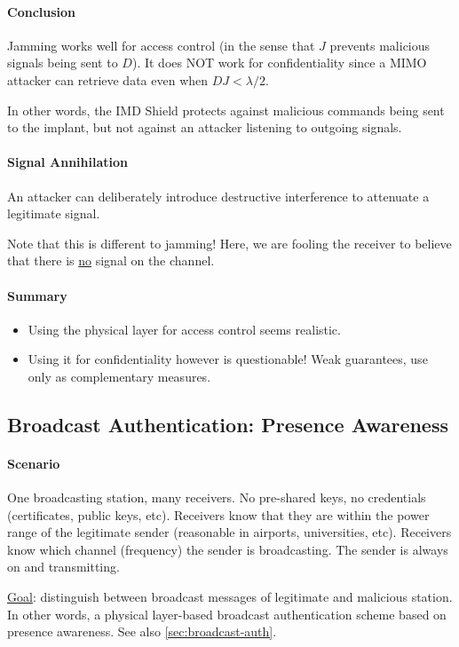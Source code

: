 \paragraph{Conclusion}
Jamming works well for access control (in the sense that $J$ prevents malicious signals being sent to $D$).
It does NOT work for confidentiality since a MIMO attacker can retrieve data even when $DJ < \lambda/2$.

In other words, the IMD Shield protects against malicious commands being sent to the implant, but not against an attacker listening to outgoing signals.

\paragraph{Signal Annihilation}
An attacker can deliberately introduce destructive interference to attenuate a legitimate signal.

Note that this is different to jamming!
Here, we are fooling the receiver to believe that there is \underline{no} signal on the channel.

\paragraph{Summary}
\begin{itemize}
	\item Using the physical layer for access control seems realistic.
	\item Using it for confidentiality however is questionable!
	Weak guarantees, use only as complementary measures.
\end{itemize}


\subsection{Broadcast Authentication: Presence Awareness}

\paragraph{Scenario}
One broadcasting station, many receivers.
No pre-shared keys, no credentials (certificates, public keys, etc).
Receivers know that they are within the power range of the legitimate sender 
(reasonable in airports, universities, etc).
Receivers know which channel (frequency) the sender is broadcasting.
The sender is always on and transmitting.

\underline{Goal}: distinguish between broadcast messages of legitimate and malicious station.
In other words, a physical layer-based broadcast authentication scheme based on presence awareness.
See also \autoref{sec:broadcast-auth}.

